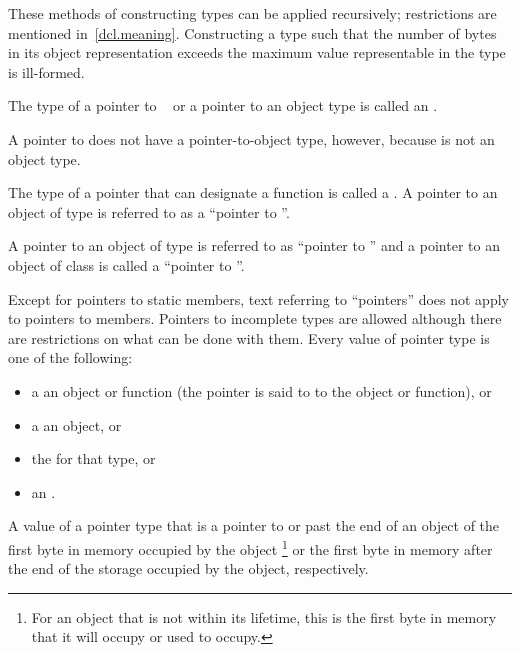 \pnum
These methods of constructing types can be applied recursively;
restrictions are mentioned in~\ref{dcl.meaning}.
Constructing a type such that the number of
bytes in its object representation exceeds the maximum value representable in
the type  is ill-formed.

\pnum
{}%
The type of a pointer to \cv{}~ or a pointer to an object type is
called an .
\begin{note}
A pointer to 
does not have a pointer-to-object type, however, because  is not
an object type.
\end{note}
The type of a pointer that can designate a function
is called a .
A pointer to an object of type  is referred to as a ``pointer to
''.
\begin{example}
A pointer to an object of type  is
referred to as ``pointer to '' and a pointer to an object of
class  is called a ``pointer to ''.
\end{example}
Except for pointers to static members, text referring to ``pointers''
does not apply to pointers to members. Pointers to incomplete types are
allowed although there are restrictions on what can be done with
them.
%
Every value of pointer type is one of the following:
\begin{itemize}
\item
a  an object or function (the pointer is said to  to the object or function), or
\item
a  an object, or
\item
{}
the  for that type, or
\item
{}
an .
\end{itemize}
A value of a
pointer type
that is a pointer to or past the end of an object
 of
the first byte in memory occupied by the object%
\footnote{For an object that is not within its lifetime,
this is the first byte in memory that it will occupy or used to occupy.}
or the first byte in memory
after the end of the storage occupied by the object,
respectively.
